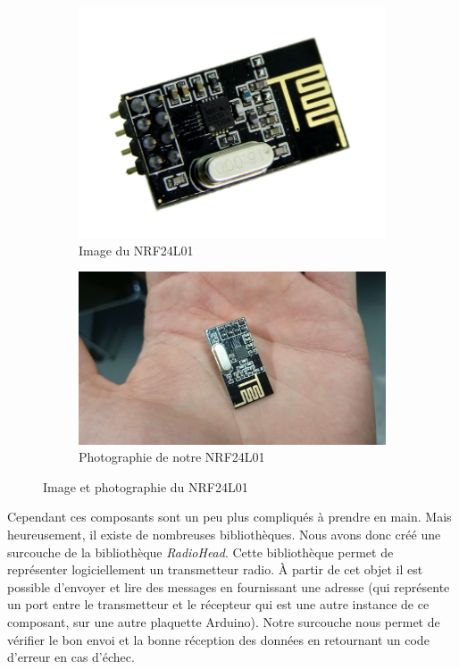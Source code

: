 \documentclass[a4paper,10pt]{report}
\begin{document}
	    \begin{figure}
	      \begin{subfigure}{.5\textwidth}
		\centering
		\includegraphics[scale=0.4]{img/image_nrf24l01.jpg}
		\caption{Image du NRF24L01}
		\label{imagenrf24L01}
	      \end{subfigure}%
	      \begin{subfigure}{.5\textwidth}
		\centering
		\includegraphics[scale=0.06]{img/nrf24l01.jpg}
		\caption{Photographie de notre NRF24L01}
		\label{photonrf24L01}
	      \end{subfigure}
	      \caption{Image et photographie du NRF24L01}
	      \label{nrf24l01}
	    \end{figure}
	    
	Cependant ces composants sont un peu plus compliqués à prendre en main. 
Mais heureusement, il existe de nombreuses bibliothèques. Nous avons donc créé 
une surcouche de la bibliothèque \textit{RadioHead}\cite{radiohead}. Cette 
bibliothèque permet de représenter logiciellement un transmetteur radio. À 
partir de cet objet il est possible d'envoyer et lire des messages en 
fournissant une adresse (qui représente un port entre le transmetteur et le 
récepteur qui est une autre instance de ce composant, sur une autre plaquette 
Arduino). Notre surcouche nous permet de vérifier le bon envoi et la bonne 
réception des données en retournant un code d'erreur en cas d'échec.
\end{document}
